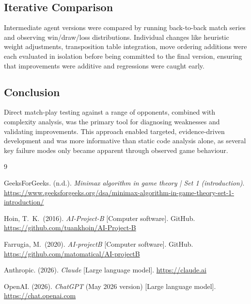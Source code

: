 \documentclass[10.5pt,a4paper]{article}
\begin{document}
\subsection{Iterative Comparison}

Intermediate agent versions were compared by running back-to-back match series and observing win/draw/loss distributions. Individual changes like heuristic weight adjustments, transposition table integration, move ordering additions were each evaluated in isolation before being committed to the final version, ensuring that improvements were additive and regressions were caught early.

\subsection{Conclusion}

Direct match-play testing against a range of opponents, combined with complexity analysis, was the primary tool for diagnosing weaknesses and validating improvements. This approach enabled targeted, evidence-driven development and was more informative than static code analysis alone, as several key failure modes only became apparent through observed game behaviour.

\newpage
\begin{thebibliography}{9}

GeeksForGeeks. (n.d.).
\textit{Minimax algorithm in game theory | Set 1 (introduction)}.
\url{https://www.geeksforgeeks.org/dsa/minimax-algorithm-in-game-theory-set-1-introduction/}

Hoin, T.\ K.\ (2016).
\textit{AI-Project-B} [Computer software].
GitHub.
\url{https://github.com/tuankhoin/AI-Project-B}

Farrugia, M.\ (2020).
\textit{AI-projectB} [Computer software].
GitHub.
\url{https://github.com/matomatical/AI-projectB}

Anthropic. (2026).
\textit{Claude} [Large language model].
\url{https://claude.ai}

OpenAI. (2026).
\textit{ChatGPT} (May 2026 version) [Large language model].
\url{https://chat.openai.com}

\end{thebibliography}
\end{document}
